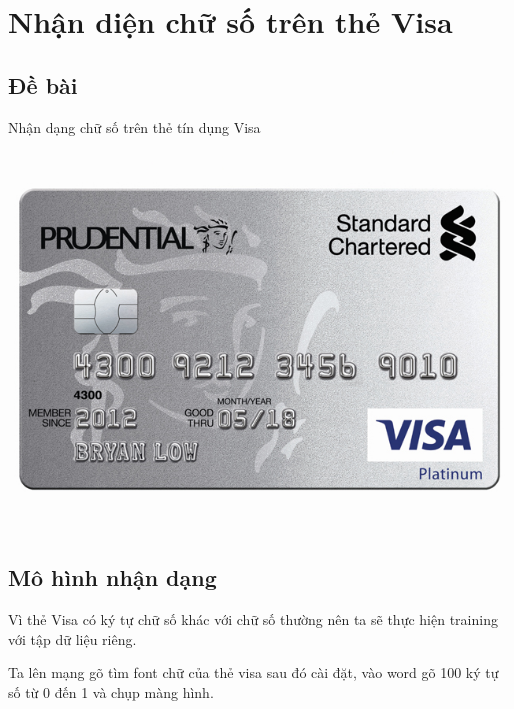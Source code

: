 \section{Nhận diện chữ số trên thẻ Visa}

\subsection{Đề bài}
Nhận dạng chữ số trên thẻ tín dụng Visa
\begin{center}
    \includegraphics[scale = 0.7]{images/Visa/inputVisa}
\end{center}

\subsection{Mô hình nhận dạng}


\quad Vì thẻ Visa có ký tự chữ số khác với chữ số thường nên ta sẽ thực
hiện training với tập dữ liệu riêng.

    \quad Ta lên mạng gõ tìm font chữ của thẻ visa sau đó cài đặt, vào word
gõ 100 ký tự số từ 0 đến 1 và chụp màng hình. 

